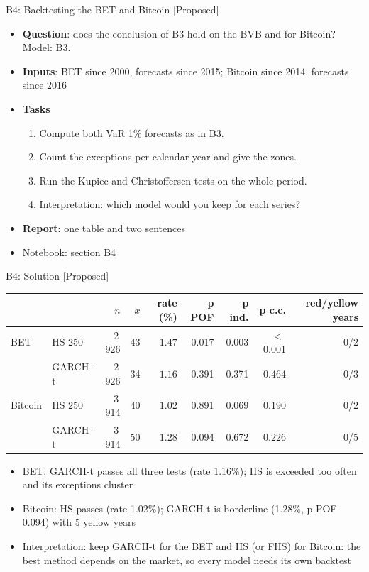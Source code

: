 \begin{frame}{B4: Backtesting the BET and Bitcoin [Proposed]}
\itemsize{\footnotesize}
\begin{itemize}
\item \textbf{Question}: does the conclusion of B3 hold on the BVB and for Bitcoin? Model: B3.
\item \textbf{Inputs}: BET since 2000, forecasts since 2015; Bitcoin since 2014, forecasts since 2016
\item \textbf{Tasks}
\begin{enumerate}
    \item Compute both VaR 1\% forecasts as in B3.
    \item Count the exceptions per calendar year and give the zones.
    \item Run the Kupiec and Christoffersen tests on the whole period.
    \item Interpretation: which model would you keep for each series?
\end{enumerate}
\item \textbf{Report}: one table and two sentences
\item Notebook: section B4
\end{itemize}
\end{frame}

\ifsolutions
\begin{frame}{B4: Solution [Proposed]}
\itemsize{\footnotesize}
\begin{center}
\scriptsize
\begin{tabular}{llrrrrrrr}
\toprule
& & $n$ & $x$ & rate (\%) & p POF & p ind. & p c.c. & red/yellow years \\
\midrule
BET & HS 250 & 2\,926 & 43 & $1.47$ & 0.017 & 0.003 & $<$\,0.001 & 0/2 \\
 & GARCH-t & 2\,926 & 34 & $1.16$ & 0.391 & 0.371 & 0.464 & 0/3 \\
Bitcoin & HS 250 & 3\,914 & 40 & $1.02$ & 0.891 & 0.069 & 0.190 & 0/2 \\
 & GARCH-t & 3\,914 & 50 & $1.28$ & 0.094 & 0.672 & 0.226 & 0/5 \\
\bottomrule
\end{tabular}
\end{center}
\begin{itemize}
    \item BET: GARCH-t passes all three tests (rate 1.16\%); HS is exceeded too often and its exceptions cluster
    \item Bitcoin: HS passes (rate 1.02\%); GARCH-t is borderline (1.28\%, p POF 0.094) with 5 yellow years
    \item Interpretation: keep GARCH-t for the BET and HS (or FHS) for Bitcoin: the best method depends on the market, so every model needs its own backtest
\end{itemize}
\end{frame}
\fi

